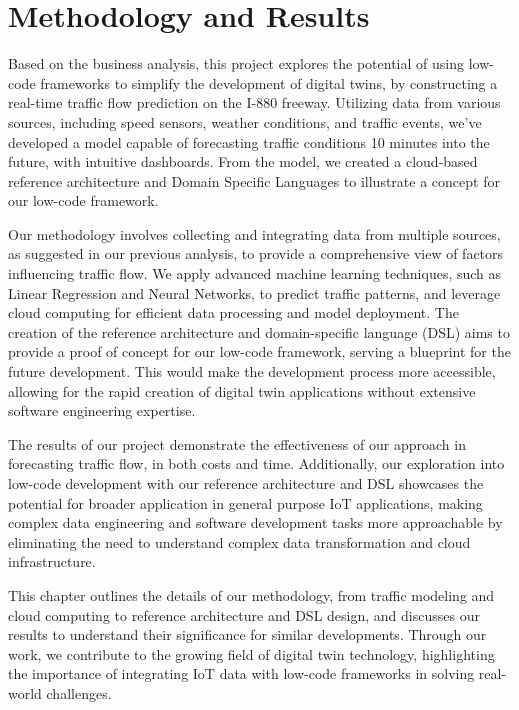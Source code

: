 \chapter{Methodology and Results}
Based on the business analysis, this project explores the potential of using low-code frameworks to simplify the development of digital twins, by constructing a real-time traffic flow prediction on the I-880 freeway. Utilizing data from various sources, including speed sensors, weather conditions, and traffic events, we've developed a model capable of forecasting traffic conditions 10 minutes into the future, with intuitive dashboards. From the model, we created a cloud-based reference architecture and Domain Specific Languages to illustrate a concept for our low-code framework.

Our methodology involves collecting and integrating data from multiple sources, as suggested in our previous analysis, to provide a comprehensive view of factors influencing traffic flow. We apply advanced machine learning techniques, such as Linear Regression and Neural Networks, to predict traffic patterns, and leverage cloud computing for efficient data processing and model deployment. The creation of the reference architecture and domain-specific language (DSL) aims to provide a proof of concept for our low-code framework, serving a blueprint for the future development. This would make the development process more accessible, allowing for the rapid creation of digital twin applications without extensive software engineering expertise.

The results of our project demonstrate the effectiveness of our approach in forecasting traffic flow, in both costs and time. Additionally, our exploration into low-code development with our reference architecture and DSL showcases the potential for broader application in general purpose IoT applications, making complex data engineering and software development tasks more approachable by eliminating the need to understand complex data transformation and cloud infrastructure.

This chapter outlines the details of our methodology, from traffic modeling and cloud computing to reference architecture and DSL design, and discusses our results to understand their significance for similar developments. Through our work, we contribute to the growing field of digital twin technology, highlighting the importance of integrating IoT data with low-code frameworks in solving real-world challenges.

\newpage

